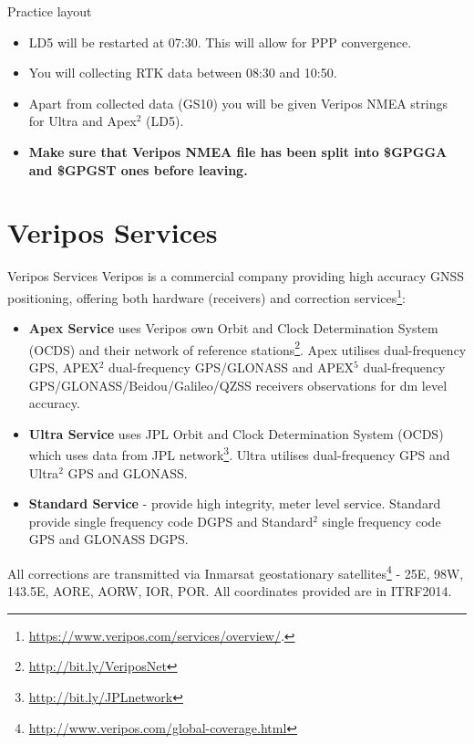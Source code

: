 \documentclass[11pt]{beamer}
\begin{document}
\begin{frame}{Practice layout}
	
	\begin{itemize}
		\item LD5 will be restarted at 07:30. This will allow for PPP convergence. 
		\item You will collecting RTK data between 08:30 and 10:50. 
		\item Apart from collected data (GS10) you will be given Veripos NMEA strings for Ultra and Apex$^2$ (LD5).
		\item \textbf{Make sure that Veripos NMEA file has been split into \$GPGGA and \$GPGST ones before leaving.}
	\end{itemize}

\end{frame}


\section{Veripos Services}

\begin{frame}[allowframebreaks]{Veripos Services}
	Veripos is a commercial company providing high accuracy GNSS positioning, offering both hardware (receivers) and correction services\footnote[frame]{\url{https://www.veripos.com/services/overview/}.}:
	
	\begin{itemize}
		\item \textbf{Apex Service} uses Veripos own Orbit and Clock Determination System (OCDS) and their network of reference stations\footnote{\url{http://bit.ly/VeriposNet}}. Apex utilises dual-frequency GPS, APEX$^2$ dual-frequency GPS/GLONASS and APEX$^5$  dual-frequency GPS/GLONASS/Beidou/Galileo/QZSS receivers observations for dm level accuracy.
		\item \textbf{Ultra Service} uses JPL Orbit and Clock Determination System (OCDS) which uses data from JPL network\footnote{\url{http://bit.ly/JPLnetwork}}. Ultra utilises dual-frequency GPS and Ultra$^2$ GPS and GLONASS.
		\item \textbf{Standard Service} - provide high integrity, meter level service. Standard provide single frequency code DGPS and Standard$^2$ single frequency code GPS and GLONASS DGPS.
	\end{itemize}
	All corrections are transmitted via Inmarsat geostationary satellites\footnote[frame]{\url{http://www.veripos.com/global-coverage.html}} - 25E, 98W, 143.5E, AORE, AORW, IOR, POR. All coordinates provided are in ITRF2014.

\end{frame}
\end{document}
